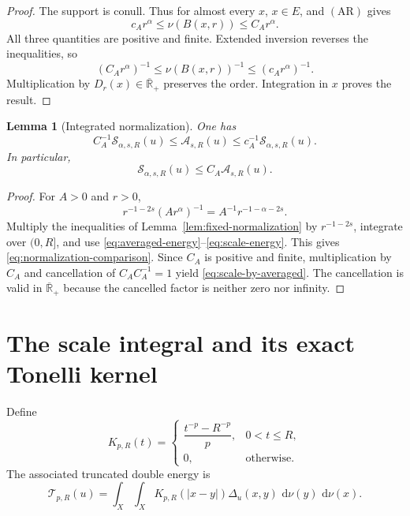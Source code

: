\documentclass[11pt]{article}
\newtheorem{lemma}[theorem]{Lemma}
\theoremstyle{remark}
\newcommand{\Rbarp}{\overline{\mathbb R}_{+}}
\newcommand{\dd}{\,\mathrm{d}}
\newcommand{\Aenergy}{\mathcal A}
\newcommand{\Senergy}{\mathcal S}
\newcommand{\Tenergy}{\mathcal T}
\begin{document}
\begin{proof}
The support is conull.  Thus for almost every \(x\), \(x\in E\), and
\((\mathrm{AR})\) gives
\[
  c_A r^\alpha
  \leq\nu(B(x,r))
  \leq C_A r^\alpha.
\]
All three quantities are positive and finite.  Extended inversion reverses
the inequalities, so
\[
  (C_A r^\alpha)^{-1}
  \leq\nu(B(x,r))^{-1}
  \leq(c_A r^\alpha)^{-1}.
\]
Multiplication by \(D_r(x)\in\Rbarp\) preserves the order.  Integration in
\(x\) proves the result.
\end{proof}

\begin{lemma}[Integrated normalization]                                   \label{lem:integrated-normalization}
One has
\begin{equation}
  C_A^{-1}\Senergy_{\alpha,s,R}(u)
  \leq
  \Aenergy_{s,R}(u)
  \leq
  c_A^{-1}\Senergy_{\alpha,s,R}(u).                                      \label{eq:normalization-comparison}
\end{equation}
In particular,
\begin{equation}
  \Senergy_{\alpha,s,R}(u)
  \leq
  C_A\Aenergy_{s,R}(u).                                                   \label{eq:scale-by-averaged}
\end{equation}
\end{lemma}

\begin{proof}
For \(A>0\) and \(r>0\),
\[
  r^{-1-2s}(A r^\alpha)^{-1}
  =
  A^{-1}r^{-1-\alpha-2s}.
\]
Multiply the inequalities of Lemma~\ref{lem:fixed-normalization} by
\(r^{-1-2s}\), integrate over \((0,R]\), and use
\eqref{eq:averaged-energy}--\eqref{eq:scale-energy}.  This gives
\eqref{eq:normalization-comparison}.  Since \(C_A\) is positive and finite,
multiplication by \(C_A\) and cancellation of \(C_A C_A^{-1}=1\) yield
\eqref{eq:scale-by-averaged}.  The cancellation is valid in \(\Rbarp\)
because the cancelled factor is neither zero nor infinity.
\end{proof}

\section{The scale integral and its exact Tonelli kernel}

Define
\begin{equation}
  K_{p,R}(t)
  =
  \begin{cases}
    \dfrac{t^{-p}-R^{-p}}{p},&0<t\leq R,\\[2mm]
    0,&\text{otherwise}.
  \end{cases}                                                            \label{eq:truncated-kernel}
\end{equation}
The associated truncated double energy is
\begin{equation}
  \Tenergy_{p,R}(u)
  =
  \int_X\int_X
  K_{p,R}(\lvert x-y\rvert)\Delta_u(x,y)
  \,\dd\nu(y)\,\dd\nu(x).                                                \label{eq:truncated-energy}
\end{equation}
\end{document}
